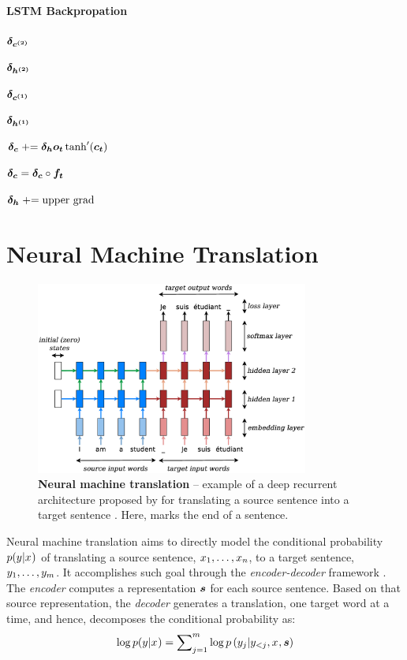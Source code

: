 \paragraph{LSTM Backpropation}
$\mbox{\boldmath{$\delta_{c^{(2)}}$}}$

$\mbox{\boldmath{$\delta_{h^{(2)}}$}}$

$\mbox{\boldmath{$\delta_{c^{(1)}}$}}$

$\mbox{\boldmath{$\delta_{h^{(1)}}$}}$

$\mbox{\boldmath{$\delta_{c}$}} \mathrel{+}= \mbox{\boldmath{$\delta_{h}$}}\mbox{\boldmath{$o_t$}}\tanh'(\mbox{\boldmath{$c_t$}}) $

$\mbox{\boldmath{$\delta_{c}$}} = \mbox{\boldmath{$\delta_{c}$}} \circ \mbox{\boldmath{$f_t$}} $

$\mbox{\boldmath{$\delta_{h}$}} \mathrel{+}= \text{upper grad}$


\section{Neural Machine Translation}
\begin{figure}[tbh!]
\centering
\includegraphics[width=0.8\textwidth, clip=true, trim= 0 0 0
0]{img/nmt_very_details.eps} %
\caption[Neural machine translation]{{\bf Neural machine translation} -- example of a deep recurrent
architecture proposed by  for
translating a source sentence  into a target sentence
. Here, \word{\texttt{\_}} marks the end of a sentence.
} 
\label{f:nmt_details}
\end{figure}


Neural machine translation aims to directly model the conditional probability $p(y_{}|x_{})$ of translating
a source sentence, $x_{1},\ldots,x_{n}$, to a target sentence, $y_{1},\ldots,y_{m}$.
It accomplishes such goal through the {\it encoder-decoder} framework \cite{sutskever14,cho14}. The {\it encoder} computes a representation $\mbox{\boldmath{$s$}}$
for each source sentence. Based on that source representation,
the {\it decoder} generates a translation, one target word at a time, and hence, decomposes the conditional probability as:
\begin{equation}
\log p(y_{}|x_{}) = \sum_{j=1}^m \nolimits \log
p\left(y_{j}|y_{<j},x_{},\mbox{\boldmath{$s$}}\right)
\end{equation}

